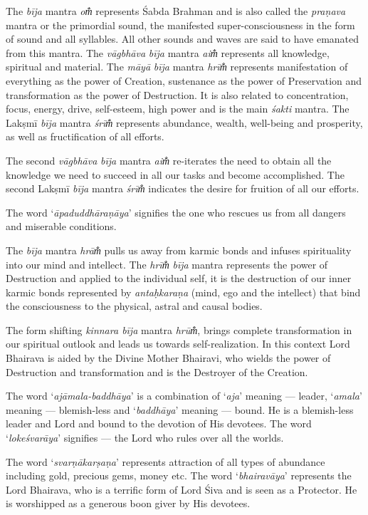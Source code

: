 \documentclass[12pt,oneside,a4paper]{article}
\newcommand{\tl}[1]{\emph{#1}}
\begin{document}
The \tl{bīja} mantra \tl{om̐} represents Śabda Brahman and is also called
the \tl{praṇava} mantra or the primordial sound, the manifested
super-consciousness in the form of sound and all syllables. All other sounds
and waves are said to have emanated from this mantra. The \tl{vāgbhāva}
\tl{bīja} mantra \tl{aim̐} represents all knowledge, spiritual and material.
The \tl{māyā} \tl{bīja} mantra \tl{hrīm̐} represents manifestation of everything
as the power of Creation, sustenance as the power of Preservation and
transformation as the power of Destruction. It is also related to concentration,
focus, energy, drive, self-esteem, high power and is the main \tl{śakti} mantra.
The Lakṣmī \tl{bīja} mantra \tl{śrīm̐} represents abundance, wealth, well-being
and prosperity, as well as fructification of all efforts.

The second \tl{vāgbhāva} \tl{bīja} mantra \tl{aim̐} re-iterates the need to
obtain all the knowledge we need to succeed in all our tasks and become
accomplished. The second Lakṣmī \tl{bīja} mantra \tl{śrīm̐} indicates the desire
for fruition of all our efforts.

The word ‘\tl{āpaduddhāraṇāya}’ signifies the one who rescues us from all
dangers and miserable conditions.

The \tl{bīja} mantra \tl{hrām̐} pulls us away from karmic bonds and infuses
spirituality into our mind and intellect. The \tl{hrīm̐} \tl{bīja} mantra
represents the power of Destruction and applied to the individual self, it is
the destruction of our inner karmic bonds represented by \tl{antaḥkaraṇa}
(mind, ego and the intellect) that bind the consciousness to the physical,
astral and causal bodies.

The form shifting \tl{kinnara bīja} mantra \tl{hrūm̐}, brings complete
transformation in our spiritual outlook and leads us towards self-realization.
In this context Lord Bhairava is aided by the Divine Mother Bhairavi, who wields
the power of Destruction and transformation and is the Destroyer of
the Creation.

The word ‘\tl{ajāmala-baddhāya}’ is a combination of ‘\tl{aja}’ meaning — leader,
‘\tl{amala}’ meaning — blemish-less and ‘\tl{baddhāya}’ meaning — bound. He is
a blemish-less leader and Lord and bound to the devotion of His devotees.
The word ‘\tl{lokeśvarāya}’ signifies — the Lord who rules over all the worlds.

The word ‘\tl{svarṇākarṣaṇa}’ represents attraction of all types of abundance
including gold, precious gems, money etc. The word ‘\tl{bhairavāya}’ represents
the Lord Bhairava, who is a terrific form of Lord Śiva and is seen as
a Protector. He is worshipped as a generous boon giver by His devotees.
\end{document}

